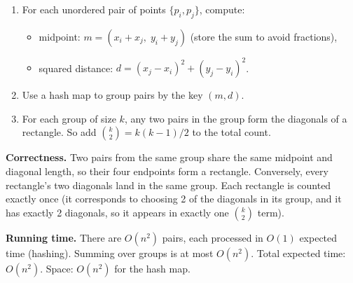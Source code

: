\documentclass[10pt]{article}
\begin{document}
\begin{enumerate}
\item For each unordered pair of points $\{p_i, p_j\}$, compute:
\begin{itemize}
    \item midpoint: $m = (x_i + x_j,\; y_i + y_j)$ (store the sum to avoid fractions),
    \item squared distance: $d = (x_j - x_i)^2 + (y_j - y_i)^2$.
\end{itemize}
\item Use a hash map to group pairs by the key $(m, d)$.
\item For each group of size $k$, any two pairs in the group form the diagonals of a rectangle.  So add $\binom{k}{2} = k(k-1)/2$ to the total count.
\end{enumerate}

\textbf{Correctness.}  Two pairs from the same group share the same midpoint and diagonal length, so their four endpoints form a rectangle.  Conversely, every rectangle's two diagonals land in the same group.  Each rectangle is counted exactly once (it corresponds to choosing 2 of the diagonals in its group, and it has exactly 2 diagonals, so it appears in exactly one $\binom{k}{2}$ term).

\textbf{Running time.}  There are $O(n^2)$ pairs, each processed in $O(1)$ expected time (hashing).  Summing over groups is at most $O(n^2)$.  Total expected time: $O(n^2)$.  Space: $O(n^2)$ for the hash map.
\end{document}
